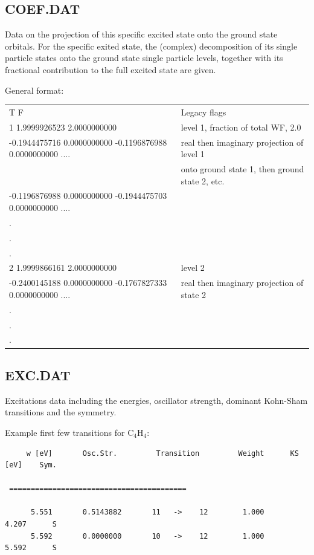 \subsection{COEF.DAT}

Data on the projection of this specific excited state onto the ground state
orbitals. For the specific exited state, the (complex) decomposition of its
single particle states onto the ground state single particle levels, together
with its fractional contribution to the full excited state are given.

General format:

\begin{tabular}{|l|p{5.5cm}|}
\hline
{\small T F                                }&Legacy flags\\
{\small   1  1.9999926523  2.0000000000    }&level 1, fraction of total WF, 2.0\\
{\small-0.1944475716  0.0000000000 -0.1196876988  0.0000000000 ....    }&real then
imaginary projection of level 1\\
                                    &onto ground state 1, then ground state 2, etc.\\
{\small-0.1196876988  0.0000000000 -0.1944475703  0.0000000000 ....    }&\\
{\small.}&\\
{\small.}&\\
{\small.}&\\
{\small   2  1.9999866161  2.0000000000    }&level 2\\
{\small-0.2400145188  0.0000000000 -0.1767827333  0.0000000000 ....}& real then
imaginary projection of state 2\\
{\small.}&\\
{\small.}&\\
{\small.}&\\ \hline
\end{tabular}

\subsection{EXC.DAT}

Excitations data including the energies, oscillator strength, dominant Kohn-Sham
transitions and the symmetry.

Example first few transitions for C$_4$H$_4$:

\begin{verbatim}
     w [eV]       Osc.Str.         Transition         Weight      KS [eV]    Sym.

 =========================================

      5.551       0.5143882       11   ->    12        1.000       4.207      S
      5.592       0.0000000       10   ->    12        1.000       5.592      S
\end{verbatim}

